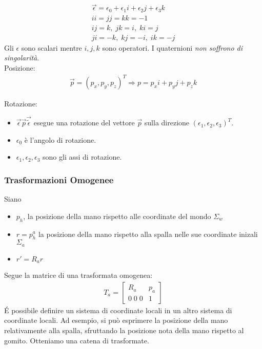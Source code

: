 \documentclass[a4paper,portrait,12pt]{article}
\theoremstyle{definition}
\begin{document}
\begin{align*}
\vec{\epsilon} = \epsilon_0 + \epsilon_1 i + \epsilon_2 j + \epsilon_3 k\\
ii = jj = kk = -1\\
ij = k,\; jk = i,\; ki = j\\
ji = -k,\; kj = -i,\; ik = -j
\end{align*}
Gli $\epsilon$ sono scalari mentre $i,j,k$ sono operatori.
I quaternioni \emph{non soffrono di singolarità}.\\

Posizione:
\begin{align*}
\vec{p} = (p_x, p_y, p_z)^T \Rightarrow p = p_x i + p_y j + p_z k
\end{align*}

Rotazione:
\begin{itemize}
\item $\vec{\epsilon}\vec{p}\vec{\tilde{\epsilon}}$ esegue una rotazione del vettore $\vec{p}$ sulla direzione $(\epsilon_1, \epsilon_2, \epsilon_3)^T$.
\item $\epsilon_0$ è l'angolo di rotazione.
\item $\epsilon_1, \epsilon_2, \epsilon_3$ sono gli assi di rotazione.
\end{itemize}

\subsubsection{Trasformazioni Omogenee}
Siano
\begin{itemize}
\item $p_h$, la posizione della mano rispetto alle coordinate del mondo $\Sigma_w$
\item $r = p_h^a$ la posizione della mano rispetto alla spalla nelle sue coordinate inizali $\Sigma_a$
\item $r'= R_a r$
\end{itemize}
Segue la matrice di una trasformata omogenea:
\begin{align*}
T_a = \left[\begin{array}{cc}
R_a & p_a\\
0\;0\;0 & 1
\end{array}\right]
\end{align*}
\'E possibile definire un sistema di coordinate locali in un altro sistema di coordinate locali.
Ad esempio, si può esprimere la posizione della mano relativamente alla spalla, sfruttando la posizione nota della mano rispetto al gomito.
Otteniamo una catena di trasformate.
\end{document}
